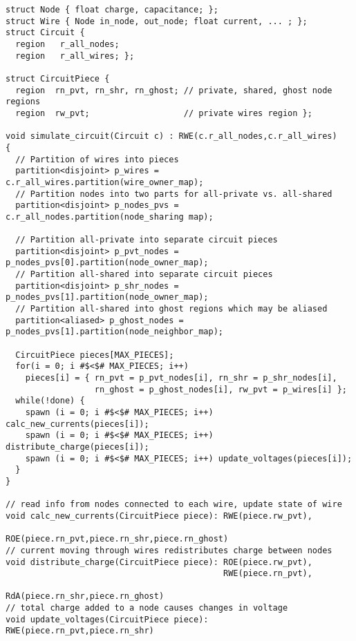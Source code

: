 \begin{lstlisting}[float={t},label={lst:code_ex},caption={Circuit Simulation Code Example}]
struct Node { float charge, capacitance; };
struct Wire { Node in_node, out_node; float current, ... ; };
struct Circuit {
  region   r_all_nodes;
  region   r_all_wires; };

struct CircuitPiece {
  region  rn_pvt, rn_shr, rn_ghost; // private, shared, ghost node regions
  region  rw_pvt;                   // private wires region };

void simulate_circuit(Circuit c) : RWE(c.r_all_nodes,c.r_all_wires)
{
  // Partition of wires into pieces
  partition<disjoint> p_wires = c.r_all_wires.partition(wire_owner_map); 
  // Partition nodes into two parts for all-private vs. all-shared
  partition<disjoint> p_nodes_pvs = c.r_all_nodes.partition(node_sharing map);

  // Partition all-private into separate circuit pieces
  partition<disjoint> p_pvt_nodes = p_nodes_pvs[0].partition(node_owner_map);
  // Partition all-shared into separate circuit pieces
  partition<disjoint> p_shr_nodes = p_nodes_pvs[1].partition(node_owner_map);
  // Partition all-shared into ghost regions which may be aliased
  partition<aliased> p_ghost_nodes = p_nodes_pvs[1].partition(node_neighbor_map);

  CircuitPiece pieces[MAX_PIECES];
  for(i = 0; i #$<$# MAX_PIECES; i++) 
    pieces[i] = { rn_pvt = p_pvt_nodes[i], rn_shr = p_shr_nodes[i],
                  rn_ghost = p_ghost_nodes[i], rw_pvt = p_wires[i] };
  while(!done) {
    spawn (i = 0; i #$<$# MAX_PIECES; i++) calc_new_currents(pieces[i]);
    spawn (i = 0; i #$<$# MAX_PIECES; i++) distribute_charge(pieces[i]);
    spawn (i = 0; i #$<$# MAX_PIECES; i++) update_voltages(pieces[i]);
  }
}

// read info from nodes connected to each wire, update state of wire
void calc_new_currents(CircuitPiece piece): RWE(piece.rw_pvt),
                                            ROE(piece.rn_pvt,piece.rn_shr,piece.rn_ghost)
// current moving through wires redistributes charge between nodes
void distribute_charge(CircuitPiece piece): ROE(piece.rw_pvt),
                                            RWE(piece.rn_pvt),
                                            RdA(piece.rn_shr,piece.rn_ghost)
// total charge added to a node causes changes in voltage
void update_voltages(CircuitPiece piece): RWE(piece.rn_pvt,piece.rn_shr)
\end{lstlisting}
